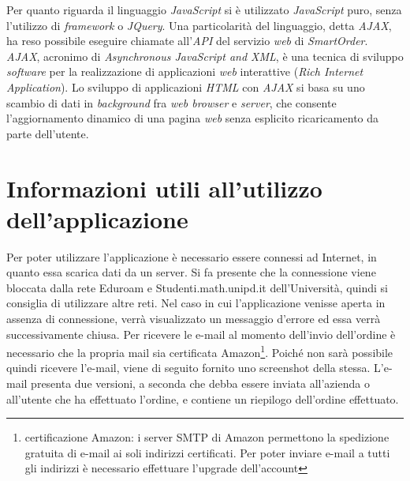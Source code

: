 \documentclass[12pt, a4paper, titlepage]{report}
\begin{document}
	\noindent Per quanto riguarda il linguaggio \textit{JavaScript} si è utilizzato \textit{JavaScript} puro, senza l'utilizzo di \textit{framework} o \textit{JQuery}. Una particolarità del linguaggio, detta \textit{AJAX}, ha reso possibile eseguire chiamate all'\textit{API} del servizio \textit{web} di \textit{SmartOrder}. \textit{AJAX}, acronimo di \textit{\textit{Asynchronous JavaScript and XML}}, è una tecnica di sviluppo \textit{software} per la realizzazione di applicazioni \textit{web} interattive (\textit{Rich Internet Application}). Lo sviluppo di applicazioni \textit{HTML} con \textit{AJAX} si basa su uno scambio di dati in \textit{background} fra \textit{web browser} e \textit{server}, che consente l'aggiornamento dinamico di una pagina \textit{web} senza esplicito ricaricamento da parte dell'utente.
		
	\section{Informazioni utili all'utilizzo dell'applicazione}
	
	Per poter utilizzare l'applicazione è necessario essere connessi ad Internet, in quanto essa scarica dati da un server. Si fa presente che la connessione viene bloccata dalla rete Eduroam e Studenti.math.unipd.it dell'Università, quindi si consiglia di utilizzare altre reti. Nel caso in cui l'applicazione venisse aperta in assenza di connessione, verrà visualizzato un messaggio d'errore ed essa verrà successivamente chiusa. Per ricevere le e-mail al momento dell'invio dell'ordine è necessario che la propria mail sia certificata Amazon\footnote{certificazione Amazon: i server SMTP di Amazon permettono la spedizione gratuita di e-mail ai soli indirizzi certificati. Per poter inviare e-mail a tutti gli indirizzi è necessario effettuare l'upgrade dell'account}. Poiché non sarà possibile quindi ricevere l'e-mail, viene di seguito fornito uno screenshot della stessa. L'e-mail presenta due versioni, a seconda che debba essere inviata all'azienda o all'utente che ha effettuato l'ordine, e contiene un riepilogo dell'ordine effettuato.
	
\end{document}

